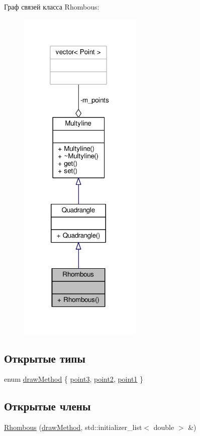 Граф связей класса Rhombous\-:
\nopagebreak
\begin{figure}[H]
\begin{center}
\leavevmode
\includegraphics[width=167pt]{class_rhombous__coll__graph}
\end{center}
\end{figure}
\subsection*{Открытые типы}
\begin{DoxyCompactItemize}
\item 
enum \hyperlink{class_rhombous_ac90a281d31799c97af62a4b63a664058}{draw\-Method} \{ \hyperlink{class_rhombous_ac90a281d31799c97af62a4b63a664058a3afc60fab182c11851e7bb8870f77352}{point3}, 
\hyperlink{class_rhombous_ac90a281d31799c97af62a4b63a664058a16d219134eda7717ac1aa16061ece158}{point2}, 
\hyperlink{class_rhombous_ac90a281d31799c97af62a4b63a664058a28041197087f875dd594d5d04b4c43ab}{point1}
 \}
\end{DoxyCompactItemize}
\subsection*{Открытые члены}
\begin{DoxyCompactItemize}
\item 
\hyperlink{class_rhombous_a1abf251c711268cd2a8f7669f4bbc9a3}{Rhombous} (\hyperlink{class_multyline_ad75d7bb224267d0d7b4c40fd72a1d920}{draw\-Method}, std\-::initializer\-\_\-list$<$ double $>$ \&)
\end{DoxyCompactItemize}


